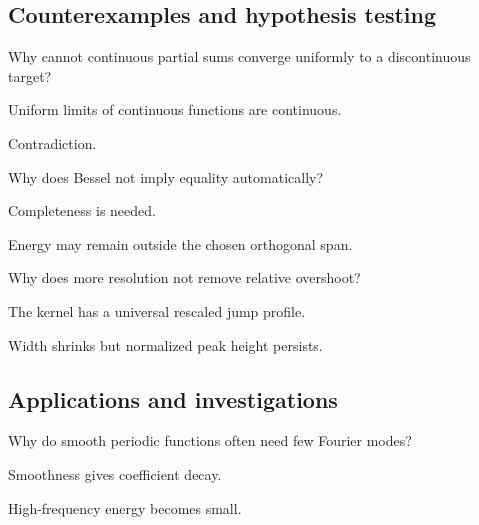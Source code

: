 \subsection*{Counterexamples and hypothesis testing}

\begin{exercise}\label{exr:iii09-expand-10}
Why cannot continuous partial sums converge uniformly to a discontinuous target?
\end{exercise}
\begin{hint}
Uniform limits of continuous functions are continuous.
\end{hint}
\begin{solution}
Contradiction.
\end{solution}

\begin{exercise}\label{exr:iii09-expand-11}
Why does Bessel not imply equality automatically?
\end{exercise}
\begin{hint}
Completeness is needed.
\end{hint}
\begin{solution}
Energy may remain outside the chosen orthogonal span.
\end{solution}

\begin{exercise}\label{exr:iii09-expand-12}
Why does more resolution not remove relative overshoot?
\end{exercise}
\begin{hint}
The kernel has a universal rescaled jump profile.
\end{hint}
\begin{solution}
Width shrinks but normalized peak height persists.
\end{solution}

\subsection*{Applications and investigations}

\begin{exercise}\label{exr:iii09-expand-13}
Why do smooth periodic functions often need few Fourier modes?
\end{exercise}
\begin{hint}
Smoothness gives coefficient decay.
\end{hint}
\begin{solution}
High-frequency energy becomes small.
\end{solution}

